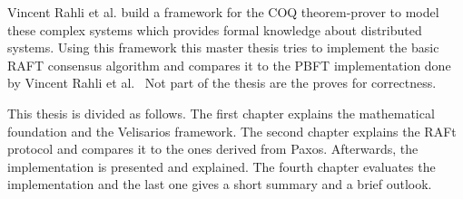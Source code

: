 Vincent Rahli et al. build a framework for the COQ theorem-prover
to model these complex systems which provides formal knowledge about distributed
systems. Using this framework this master thesis tries to implement
the basic RAFT consensus algorithm and compares it to the PBFT implementation
done by Vincent Rahli et al.~\cite{rahli2018velisarios}
Not part of the thesis are the proves for correctness.

This thesis is divided as follows. The first chapter explains the
mathematical foundation and the Velisarios framework. The second chapter
explains the RAFt protocol and compares it to the ones derived from Paxos.
Afterwards, the implementation is presented and explained. The fourth chapter
evaluates the implementation and the last one gives a short summary and a
brief outlook.


